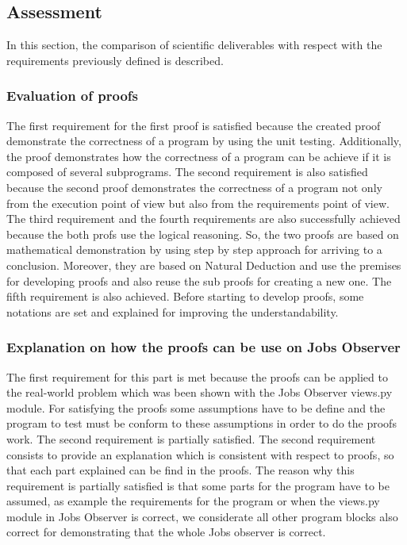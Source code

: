 \documentclass[conference,compsoc]{IEEEtran}
\begin{document}
\subsection{Assessment}
In this section, the comparison of scientific deliverables with respect with the requirements previously defined is described. 

\subsubsection{Evaluation of proofs}
The first requirement for the first proof is satisfied because the created proof demonstrate the correctness of a program by using the unit testing. Additionally, the proof demonstrates how the correctness of a program can be achieve if it is composed of several subprograms. 
\newline
The second requirement is also satisfied because the second proof demonstrates the correctness of a program not only from the execution point of view but also from the requirements point of view. 
\newline
The third requirement and the fourth requirements are also successfully achieved because the both profs use the logical reasoning. So, the two proofs are based on mathematical demonstration by using step by step approach for arriving to a conclusion. Moreover, they are based on Natural Deduction and use the premises for developing proofs and also reuse the sub proofs for creating a new one. 
\newline
The fifth requirement is also achieved. Before starting to develop proofs, some notations are set and explained for improving the understandability. 

\subsubsection{Explanation on how the proofs can be use on Jobs Observer}
The first requirement for this part is met because the proofs can be applied to the real-world problem which was been shown with the Jobs Observer views.py module. For satisfying the proofs some assumptions have to be define and the program to test must be conform to these assumptions in order to do the proofs work. 
The second requirement is partially satisfied. The second requirement consists to provide an explanation which is consistent with respect to proofs, so that each part explained can be find in the proofs. The reason why this requirement is partially satisfied is that some parts for the program have to be assumed, as example the requirements for the program or when the views.py module in Jobs Observer is correct, we considerate all other program blocks also correct for demonstrating that the whole Jobs observer is correct.  
\end{document}
